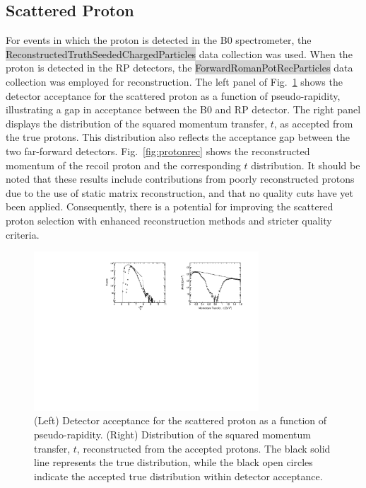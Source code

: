 \documentclass[letterpaper,12pt]{article}
\begin{document}
\subsection{Scattered Proton}\label{subsec:ScatteredProton}
For events in which the proton is detected in the B0 spectrometer, the \colorbox{lightgray}{ReconstructedTruthSeededChargedParticles} data collection was used. When the proton is detected in the RP detectors, the \colorbox{lightgray}{ForwardRomanPotRecParticles} data collection was employed for reconstruction. The left panel of Fig.~\ref{fig:protonacc} shows the detector acceptance for the scattered proton as a function of pseudo-rapidity, illustrating a gap in acceptance between the B0 and RP detector. The right panel displays the distribution of the squared momentum transfer, $t$, as accepted from the true protons. This distribution also reflects the acceptance gap between the two far-forward detectors. Fig.~\ref{fig:protonrec} shows the reconstructed momentum of the recoil proton and the corresponding $t$ distribution. It should be noted that these results include contributions from poorly reconstructed protons due to the use of static matrix reconstruction, and that no quality cuts have yet been applied. Consequently, there is a potential for improving the scattered proton selection with enhanced reconstruction methods and stricter quality criteria.

\begin{figure}[ht]
    \centering
    \includegraphics[width=0.75\textwidth]{Figures/proton_acc.pdf}
    \caption{(Left) Detector acceptance for the scattered proton as a function of pseudo-rapidity. (Right) Distribution of the squared momentum transfer, $t$, reconstructed from the accepted protons. The black solid line represents the true distribution, while the black open circles indicate the accepted true distribution within detector acceptance.}
\label{fig:protonacc}
\end{figure}
\end{document}
